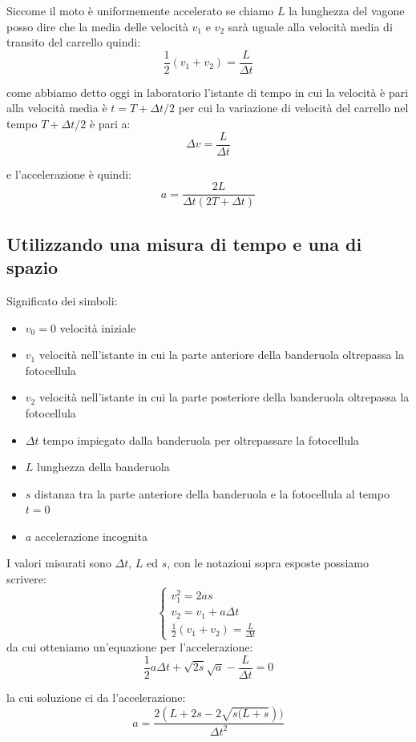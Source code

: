 \documentclass[a4paper,10pt,oneside]{article}
\begin{document}
Siccome il moto è uniformemente accelerato se chiamo $L$ la lunghezza del vagone posso dire che la media delle velocità $v_1$ e $v_2$ sarà uguale alla velocità media di transito del carrello quindi:
\begin{equation}
 \frac 1 2(v_1+v_2)=\frac{L}{\Delta t}
\end{equation}

come abbiamo detto oggi in laboratorio l'istante di tempo in cui la velocità è pari alla velocità media è $t=T+\Delta t/2$  per cui la variazione di velocità del carrello nel tempo $T+\Delta t/2$ è pari a:
\begin{equation}
 \Delta v=\frac{L}{\Delta t}
\end{equation}

e l'accelerazione è quindi:
\begin{equation}
 a=\frac{2L}{\Delta t(2T+\Delta t)}
\end{equation}


\subsection*{Utilizzando una misura di tempo e una di spazio}

Significato dei simboli:
\begin{itemize}
 \item $v_0=0$ velocità iniziale
 \item $v_1$ velocità nell'istante in cui la parte anteriore della banderuola oltrepassa la fotocellula
 \item $v_2$ velocità nell'istante in cui la parte posteriore della banderuola oltrepassa la fotocellula
\item $\Delta t$ tempo impiegato dalla banderuola per oltrepassare la fotocellula
\item $L$ lunghezza della banderuola
\item $s$ distanza tra la parte anteriore della banderuola e la fotocellula al tempo $t=0$
\item $a$ accelerazione incognita
\end{itemize}

I valori misurati sono $\Delta t$, $L$ ed $s$, con le notazioni sopra esposte possiamo scrivere:
\begin{equation}
 \begin{cases}
    v_1^2=2as\\
    v_2=v_1+a\Delta t\\
    \frac 1 2(v_1+v_2)=\frac{L}{\Delta t}
 \end{cases}
\end{equation}
da cui otteniamo un'equazione per l'accelerazione:
\begin{equation}
 \frac{1}{2}a\Delta t+\sqrt{2s}\sqrt{a}-\frac{L}{\Delta t}=0
\end{equation}

la cui soluzione ci da l'accelerazione:
\begin{equation}
 a=\frac{2(L+2s-2\sqrt{s(L+s}))}{\Delta t^2}
\end{equation}
\end{document}

